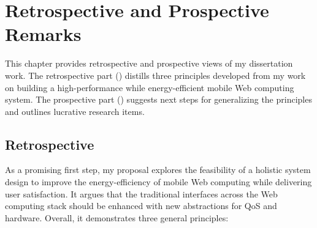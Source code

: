 
\chapter{Retrospective and Prospective Remarks}
\label{sec:conc}

This chapter provides retrospective and prospective views of my dissertation work. The retrospective part () distills three principles developed from my work on building a high-performance while energy-efficient mobile Web computing system. The prospective part () suggests next steps for generalizing the principles and outlines lucrative research items.

\section{Retrospective}
\label{sec:conc:retro}

As a promising first step, my proposal explores the feasibility of a holistic system design to improve the energy-efficiency of mobile Web computing while delivering user satisfaction. It argues that the traditional interfaces across the Web computing stack should be enhanced with new abstractions for QoS and hardware. Overall, it demonstrates three general principles:

